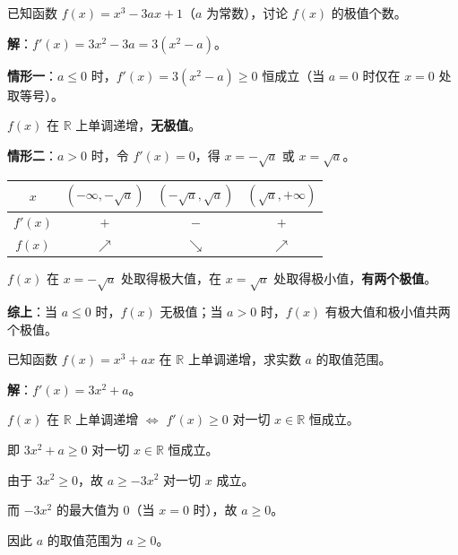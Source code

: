 \documentclass[12pt, a4paper]{ctexart}
\begin{document}
\begin{examplebox}[【例题10】含参讨论极值个数]
已知函数 $f(x) = x^3 - 3ax + 1$（$a$ 为常数），讨论 $f(x)$ 的极值个数。
\end{examplebox}

\textbf{解}：$f'(x) = 3x^2 - 3a = 3(x^2 - a)$。

\textbf{情形一}：$a \leqslant 0$ 时，$f'(x) = 3(x^2 - a) \geqslant 0$ 恒成立（当 $a = 0$ 时仅在 $x = 0$ 处取等号）。

$f(x)$ 在 $\mathbb{R}$ 上单调递增，\textbf{无极值}。

\textbf{情形二}：$a > 0$ 时，令 $f'(x) = 0$，得 $x = -\sqrt{a}$ 或 $x = \sqrt{a}$。

\begin{center}
\renewcommand{\arraystretch}{1.4}
\begin{tabular}{c|c|c|c}
\toprule
$x$ & $(-\infty, -\sqrt{a})$ & $(-\sqrt{a}, \sqrt{a})$ & $(\sqrt{a}, +\infty)$ \\
\midrule
$f'(x)$ & $+$ & $-$ & $+$ \\
$f(x)$ & $\nearrow$ & $\searrow$ & $\nearrow$ \\
\bottomrule
\end{tabular}
\end{center}

$f(x)$ 在 $x = -\sqrt{a}$ 处取得极大值，在 $x = \sqrt{a}$ 处取得极小值，\textbf{有两个极值}。

\textbf{综上}：当 $a \leqslant 0$ 时，$f(x)$ 无极值；当 $a > 0$ 时，$f(x)$ 有极大值和极小值共两个极值。

\begin{examplebox}[【例题11】利用单调性求参数范围]
已知函数 $f(x) = x^3 + ax$ 在 $\mathbb{R}$ 上单调递增，求实数 $a$ 的取值范围。
\end{examplebox}

\textbf{解}：$f'(x) = 3x^2 + a$。

$f(x)$ 在 $\mathbb{R}$ 上单调递增 $\Leftrightarrow$ $f'(x) \geqslant 0$ 对一切 $x \in \mathbb{R}$ 恒成立。

即 $3x^2 + a \geqslant 0$ 对一切 $x \in \mathbb{R}$ 恒成立。

由于 $3x^2 \geqslant 0$，故 $a \geqslant -3x^2$ 对一切 $x$ 成立。

而 $-3x^2$ 的最大值为 $0$（当 $x = 0$ 时），故 $a \geqslant 0$。

因此 $a$ 的取值范围为 $\boxed{a \geqslant 0}$。

\end{document}
